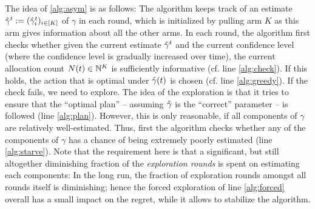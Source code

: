 The idea of \cref{alg:asym} is as follows:
The algorithm keeps track of an estimate $\hat{\gamma}^{t}:=(\hat{\gamma}^t_i)_{i \in [K]}$ of $\gamma$ in each round, which is initialized by pulling arm $K$ as this arm
gives information about all the other arms.
In each round, the algorithm first checks whether given the current estimate $\hat{\gamma}^t$ and the current confidence level (where the confidence level is gradually increased over time), the current allocation count $N(t)\in \mathbb{N}^K$
is sufficiently informative (cf. line \ref{alg:check}). If this holds, the action that is optimal under $\hat{\gamma}(t)$ is chosen 
(cf. line \ref{alg:greedy}). If the check fails, we need to explore.
The idea of the exploration is that it tries to ensure that the ``optimal plan'' -- assuming $\hat{\gamma}$ is the ``correct'' parameter -- is followed (line \ref{alg:plan}). However, this is only reasonable, if all components of $\gamma$ are relatively well-estimated.
Thus, first the algorithm checks whether any of the components of $\gamma$ has a chance of being
extremely poorly estimated (line \ref{alg:starve}). Note that the requirement here is that a significant, but still altogether diminishing fraction of the \emph{exploration rounds} is spent on estimating each components: In the long run, the fraction of exploration rounds amongst all rounds itself is diminishing; hence the forced exploration of line \ref{alg:forced} overall has a small impact on the regret, while it allows to stabilize the algorithm.

